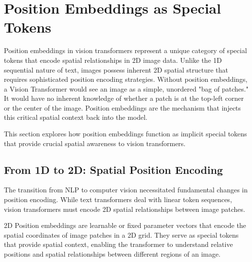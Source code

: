 
\section{Position Embeddings as Special Tokens}

Position embeddings in vision transformers represent a unique category of special tokens that encode spatial relationships in 2D image data. Unlike the 1D sequential nature of text, images possess inherent 2D spatial structure that requires sophisticated position encoding strategies. Without position embeddings, a Vision Transformer would see an image as a simple, unordered "bag of patches." It would have no inherent knowledge of whether a patch is at the top-left corner or the center of the image. Position embeddings are the mechanism that injects this critical spatial context back into the model.

This section explores how position embeddings function as implicit special tokens that provide crucial spatial awareness to vision transformers.

\subsection{From 1D to 2D: Spatial Position Encoding}

The transition from NLP to computer vision necessitated fundamental changes in position encoding. While text transformers deal with linear token sequences, vision transformers must encode 2D spatial relationships between image patches.

\begin{definition}
2D Position embeddings are learnable or fixed parameter vectors that encode the spatial coordinates of image patches in a 2D grid. They serve as special tokens that provide spatial context, enabling the transformer to understand relative positions and spatial relationships between different regions of an image.
\end{definition}

